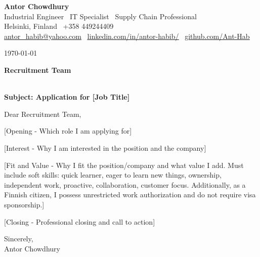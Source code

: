 \documentclass[11pt,a4paper]{article}
\begin{document}
\vspace*{0.05in}

\begin{center}
    {\Huge {}\selectfont \textbf{Antor Chowdhury}} \\[4pt]
    {\large {}\selectfont Industrial Engineer \textbar\ IT Specialist \textbar\ Supply Chain Professional} \\[4pt]
    \small
    Helsinki, Finland \textbar\ +358 449244409 \\[2pt] 
    \href{mailto:antor_habib@yahoo.com}{\underline{antor\_habib@yahoo.com}} \textbar\ 
    \href{https://www.linkedin.com/in/antor-habib/}{\underline{linkedin.com/in/antor-habib/}} \textbar\ 
    \href{https://github.com/Ant-Hab}{\underline{github.com/Ant-Hab}}
\end{center}

\vspace{16pt} 

\today

\vspace{8pt}

\textbf{Recruitment Team} \\
[Company Name] \\
[Location]

\vspace{12pt}

\textbf{Subject: Application for [Job Title]}

\vspace{12pt}

Dear Recruitment Team,

[Opening - Which role I am applying for]

[Interest - Why I am interested in the position and the company]

[Fit and Value - Why I fit the position/company and what value I add. Must include soft skills: quick learner, eager to learn new things, ownership, independent work, proactive, collaboration, customer focus. Additionally, as a Finnish citizen, I possess unrestricted work authorization and do not require visa sponsorship.]

[Closing - Professional closing and call to action]

\vspace{14pt}

Sincerely, \\
Antor Chowdhury
\end{document}
